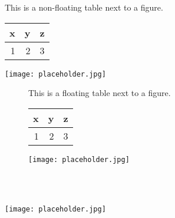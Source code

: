 \documentclass[10pt,oneside]{book}
\begin{document}
\noindent
\begin{minipage}{\textwidth}
  This is a non-floating table next to a figure.

\flushleft
\begin{minipage}{.48\linewidth}
  \centering
  \begin{tabular}{rrr}
    \toprule
    x & y & z \\
    \midrule
    1 & 2 & 3 \\
    \bottomrule
  \end{tabular}
  \label{tab:tableexample3}
\end{minipage}
\quad
\begin{minipage}{.48\linewidth}
  \centering
  \texttt{[image: placeholder.jpg]}
  \label{fig:graph1}
\end{minipage}%
\end{minipage}



\begin{figure}
  This is a floating table next to a figure.

\flushleft
\begin{minipage}{.48\linewidth}
  \centering
  \begin{tabular}{rrr}
    \toprule
    x & y & z \\
    \midrule
    1 & 2 & 3 \\
    \bottomrule
  \end{tabular}
  \label{tab:tableexample3}
\end{minipage}
\quad
\begin{minipage}{.48\linewidth}
  \centering
  \texttt{[image: placeholder.jpg]}
  \label{fig:graph1}
\end{minipage}%
\end{figure}



\begin{widefigure}
  \begin{minipage}[t]{0.25\linewidth}
    \mbox{}\\
    \label{fig:blah}
  \end{minipage}
  \hfill
  \begin{minipage}[t]{0.715\linewidth}
    \mbox{}\\
    \texttt{[image: placeholder.jpg]}
  \end{minipage}
\end{widefigure}
\end{document}
